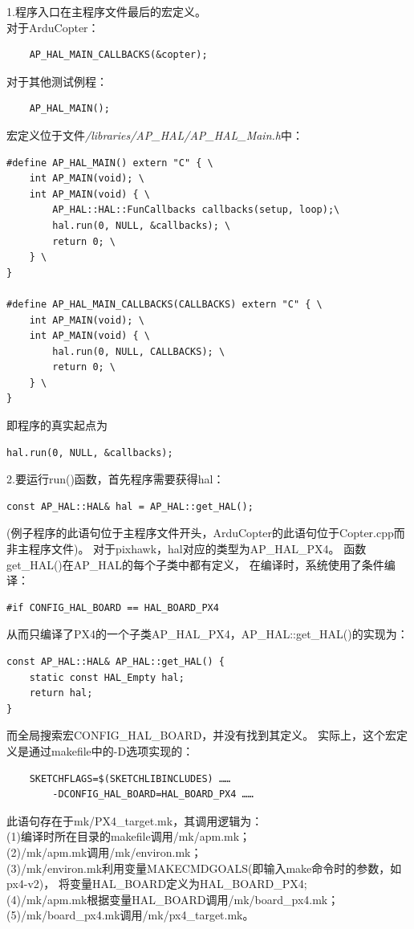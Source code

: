 \documentclass[a4paper,10pt]{ctexart} %
\begin{document}
1.程序入口在主程序文件最后的宏定义。\\
\noindent 对于ArduCopter：
\begin{lstlisting}
	AP_HAL_MAIN_CALLBACKS(&copter);
\end{lstlisting}
对于其他测试例程：
\begin{lstlisting}
	AP_HAL_MAIN();
\end{lstlisting}
宏定义位于文件\textit{/libraries/AP\_HAL/AP\_HAL\_Main.h}中：
\begin{lstlisting}
#define AP_HAL_MAIN() extern "C" { \
	int AP_MAIN(void); \
	int AP_MAIN(void) { \
		AP_HAL::HAL::FunCallbacks callbacks(setup, loop);\
		hal.run(0, NULL, &callbacks); \
		return 0; \
	} \
}

#define AP_HAL_MAIN_CALLBACKS(CALLBACKS) extern "C" { \
	int AP_MAIN(void); \
	int AP_MAIN(void) { \
		hal.run(0, NULL, CALLBACKS); \
		return 0; \
	} \
}
\end{lstlisting}
即程序的真实起点为
\begin{lstlisting}
hal.run(0, NULL, &callbacks); 
\end{lstlisting}

2.要运行run()函数，首先程序需要获得hal：
\begin{lstlisting}
const AP_HAL::HAL& hal = AP_HAL::get_HAL();
\end{lstlisting}
(例子程序的此语句位于主程序文件开头，ArduCopter的此语句位于Copter.cpp而非主程序文件)。
对于pixhawk，hal对应的类型为AP\_HAL\_PX4。
函数get\_HAL()在AP\_HAL的每个子类中都有定义，
在编译时，系统使用了条件编译：
\begin{lstlisting}
#if CONFIG_HAL_BOARD == HAL_BOARD_PX4
\end{lstlisting}
从而只编译了PX4的一个子类AP\_HAL\_PX4，AP\_HAL::get\_HAL()的实现为：
\begin{lstlisting}
const AP_HAL::HAL& AP_HAL::get_HAL() {
    static const HAL_Empty hal;
    return hal;
}
\end{lstlisting}
而全局搜索宏CONFIG\_HAL\_BOARD，并没有找到其定义。
实际上，这个宏定义是通过makefile中的-D选项实现的：

\begin{lstlisting}
	SKETCHFLAGS=$(SKETCHLIBINCLUDES) ……
	 	-DCONFIG_HAL_BOARD=HAL_BOARD_PX4 ……
\end{lstlisting}
此语句存在于mk/PX4\_target.mk，其调用逻辑为：\\
(1)编译时所在目录的makefile调用/mk/apm.mk；\\
(2)/mk/apm.mk调用/mk/environ.mk；\\
(3)/mk/environ.mk利用变量MAKECMDGOALS(即输入make命令时的参数，如px4-v2)，
将变量HAL\_BOARD定义为HAL\_BOARD\_PX4;\\
(4)/mk/apm.mk根据变量HAL\_BOARD调用/mk/board\_px4.mk；\\
(5)/mk/board\_px4.mk调用/mk/px4\_target.mk。
\end{document}
